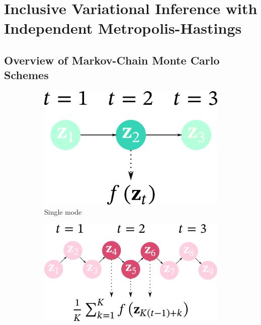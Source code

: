 
\section{Inclusive Variational Inference with Independent Metropolis-Hastings}
\subsection{Overview of Markov-Chain Monte Carlo Schemes}\label{section:msc_mcmc}

\begin{figure}
    \centering
    \begin{subfigure}[b]{0.25\textwidth}
        \centering
        \includegraphics[scale=0.25]{figures/diagram_1.png}
        \caption{Single mode}\label{fig:single}
    \end{subfigure}
    \begin{subfigure}[b]{0.35\textwidth}
        \centering
        \includegraphics[scale=0.25]{figures/diagram_2.png}

\end{subfigure}
\end{figure}
